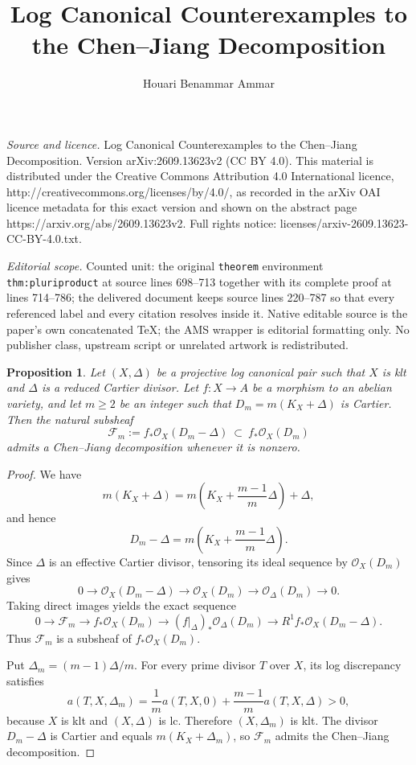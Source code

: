 \documentclass[10pt,a4paper]{amsart}
\newtheorem{proposition}[theorem]{Proposition}
\newcommand{\OO}{\mathcal O}
\newcommand{\FF}{\mathcal F}
\begin{document}
\title[Log Canonical Counterexamples to the Chen--Jiang Decompositi]{Log Canonical Counterexamples to the Chen--Jiang Decomposition}
\author{Houari Benammar Ammar}
\date{}
\maketitle
\noindent\emph{Source and licence.} Log Canonical Counterexamples to the Chen--Jiang Decomposition. Version arXiv:2609.13623v2 (CC BY 4.0). This material is distributed under the Creative Commons Attribution 4.0 International licence, http://creativecommons.org/licenses/by/4.0/, as recorded in the arXiv OAI licence metadata for this exact version and shown on the abstract page https://arxiv.org/abs/2609.13623v2. Full rights notice: licenses/arxiv-2609.13623-CC-BY-4.0.txt.\par\smallskip
\noindent\textit{Editorial scope.} Counted unit: the original \texttt{theorem} environment \texttt{thm:pluriproduct} at source lines 698--713 together with its complete proof at lines 714--786; the delivered document keeps source lines 220--787 so that every referenced label and every citation resolves inside it. Native editable source is the paper's own concatenated TeX; the AMS wrapper is editorial formatting only. No publisher class, upstream script or unrelated artwork is redistributed.
\begin{proposition}\label{prop:subsheaf}
Let $(X,\Delta)$ be a projective log canonical pair such that $X$ is klt and $\Delta$ is a reduced Cartier divisor. Let $f:X\to A$ be a morphism to an abelian variety, and let $m\ge2$ be an integer such that $D_m=m(K_X+\Delta)$ is Cartier. Then the natural subsheaf
\[
\FF_m:=f_*\OO_X(D_m-\Delta)\ \subset\ f_*\OO_X(D_m)
\]
admits a Chen--Jiang decomposition whenever it is nonzero.
\end{proposition}
\begin{proof}
We have
\[
m(K_X+\Delta)=m\left(K_X+\frac{m-1}{m}\Delta\right)+\Delta,
\]
and hence
\[
D_m-\Delta=m\left(K_X+\frac{m-1}{m}\Delta\right).
\]
Since $\Delta$ is an effective Cartier divisor, tensoring its ideal sequence by $\OO_X(D_m)$ gives
\begin{equation}\label{eq:boundarysequence}
0\longrightarrow\OO_X(D_m-\Delta)\longrightarrow\OO_X(D_m)
\longrightarrow\OO_\Delta(D_m)\longrightarrow0.
\end{equation}
Taking direct images yields the exact sequence
\[
0\longrightarrow\FF_m\longrightarrow f_*\OO_X(D_m)
\longrightarrow(f|_\Delta)_*\OO_\Delta(D_m)
\longrightarrow R^1f_*\OO_X(D_m-\Delta).
\]
Thus $\FF_m$ is a subsheaf of $f_*\OO_X(D_m)$.

Put $\Delta_m=(m-1)\Delta/m$. For every prime divisor $T$ over $X$, its log discrepancy satisfies
\[
a(T,X,\Delta_m)=\frac1m a(T,X,0)+\frac{m-1}{m}a(T,X,\Delta)>0,
\]
because $X$ is klt and $(X,\Delta)$ is lc. Therefore $(X,\Delta_m)$ is klt. The divisor $D_m-\Delta$ is Cartier and equals $m(K_X+\Delta_m)$, so $\FF_m$ admits the Chen--Jiang decomposition.
\end{proof}
\end{document}
